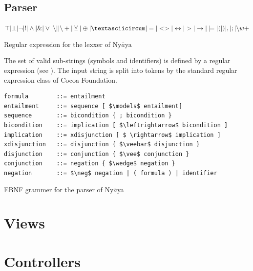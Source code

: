 \subsection{Parser}


\cite{Louden:1997:CCP:523017}

\begin{table}[htdp]
\begin{center}
$\top | \bot 
| \neg | !
| \wedge | \&
| \vee | {\setminus}| | {\setminus}+ 
| \veebar | \oplus | \textasciicircum
| = | <> | \leftrightarrow 
| > | \rightarrow | \models
| ( | ) | , | ; 
| {\setminus}w+$ 
\caption{Regular expression for the lexxer of Ny$\bar{a}$ya}
\label{tab:REGEX}
\end{center}
\end{table}


The set of valid sub-strings (symbols and identifiers) is defined by a regular expression (see ). 
The input string is split into tokens by the standard regular expression class of Cocoa Foundation.

\begin{table}[htdp]
\begin{center}
\begin{lstlisting}[mathescape]
formula        ::= entailment
entailment     ::= sequence [ $\models$ entailment]
sequence       ::= bicondition { ; bicondition } 
bicondition    ::= implication [ $\leftrightarrow$ bicondition ]
implication    ::= xdisjunction [ $ \rightarrow$ implication ]
xdisjunction   ::= disjunction { $\veebar$ disjunction }
disjunction    ::= conjunction { $\vee$ conjunction }
conjunction    ::= negation { $\wedge$ negation }
negation       ::= $\neg$ negation | ( formula ) | identifier
\end{lstlisting}
\caption{EBNF grammer for the parser of Ny$\bar{a}$ya}
\label{tab:EBNF}
\end{center}
\end{table}


\section{Views}

\section{Controllers}






